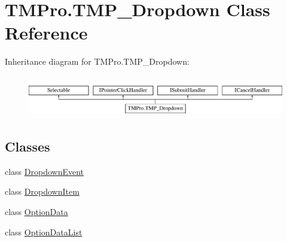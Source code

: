 \hypertarget{class_t_m_pro_1_1_t_m_p___dropdown}{}\section{T\+M\+Pro.\+T\+M\+P\+\_\+\+Dropdown Class Reference}
\label{class_t_m_pro_1_1_t_m_p___dropdown}
Inheritance diagram for T\+M\+Pro.\+T\+M\+P\+\_\+\+Dropdown\+:\begin{figure}[H]
\begin{center}
\leavevmode
\includegraphics[height=1.830065cm]{class_t_m_pro_1_1_t_m_p___dropdown}
\end{center}
\end{figure}
\subsection*{Classes}
\begin{DoxyCompactItemize}
\item 
class \mbox{\hyperlink{class_t_m_pro_1_1_t_m_p___dropdown_1_1_dropdown_event}{Dropdown\+Event}}
\item 
class \mbox{\hyperlink{class_t_m_pro_1_1_t_m_p___dropdown_1_1_dropdown_item}{Dropdown\+Item}}
\item 
class \mbox{\hyperlink{class_t_m_pro_1_1_t_m_p___dropdown_1_1_option_data}{Option\+Data}}
\item 
class \mbox{\hyperlink{class_t_m_pro_1_1_t_m_p___dropdown_1_1_option_data_list}{Option\+Data\+List}}
\end{DoxyCompactItemize}
